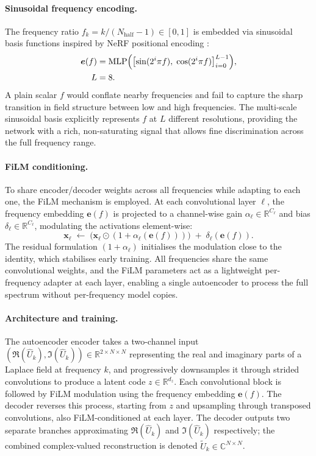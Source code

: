 \documentclass[a4paper, twocolumn]{article}
\newcommand{\R}{\mathbb{R}}
\newcommand{\C}{\mathbb{C}}
\begin{document}
\paragraph{Sinusoidal frequency encoding.}
The frequency ratio $f_k = k/(N_{\mathrm{half}}-1) \in [0,1]$ is embedded via sinusoidal basis functions inspired by NeRF positional encoding \cite{mildenhall2020nerf}:
\begin{equation}
\begin{split}
    \bm{e}(f) &= \mathrm{MLP}\Bigl(\bigl[\sin(2^i\pi f),\; \cos(2^i\pi f)\bigr]_{i=0}^{L-1}\Bigr), \\
    L &= 8.
\end{split}
    \label{eq:posenc}
\end{equation}
A plain scalar $f$ would conflate nearby frequencies and fail to capture the sharp transition in field structure between low and high frequencies. The multi-scale sinusoidal basis explicitly represents $f$ at $L$ different resolutions, providing the network with a rich, non-saturating signal that allows fine discrimination across the full frequency range.

\paragraph{FiLM conditioning.}
To share encoder/decoder weights across all frequencies while adapting to each one, the FiLM mechanism \cite{perez2018film} is employed. At each convolutional layer $\ell$, the frequency embedding $\bm{e}(f)$ is projected to a channel-wise gain $\alpha_\ell \in \R^{C_\ell}$ and bias $\delta_\ell \in \R^{C_\ell}$, modulating the activations element-wise:
\begin{equation}
    \bm{x}_\ell \;\leftarrow\; \bigl(\bm{x}_\ell \odot (1 + \alpha_\ell(\bm{e}(f)))\bigr) \;+\; \delta_\ell(\bm{e}(f)).
    \label{eq:film}
\end{equation}
The residual formulation $(1 + \alpha_\ell)$ initialises the modulation close to the identity, which stabilises early training. All frequencies share the same convolutional weights, and the FiLM parameters act as a lightweight per-frequency adapter at each layer, enabling a single autoencoder to process the full spectrum without per-frequency model copies.

\paragraph{Architecture and training.}
The autoencoder encoder takes a two-channel input $(\Re(\hat{U}_k), \Im(\hat{U}_k)) \in \R^{2 \times N \times N}$ representing the real and imaginary parts of a Laplace field at frequency $k$, and progressively downsamples it through strided convolutions to produce a latent code $z \in \R^{d_z}$. Each convolutional block is followed by FiLM modulation using the frequency embedding $\bm{e}(f)$. The decoder reverses this process, starting from $z$ and upsampling through transposed convolutions, also FiLM-conditioned at each layer. The decoder outputs two separate branches approximating $\Re(\hat{U}_k)$ and $\Im(\hat{U}_k)$ respectively; the combined complex-valued reconstruction is denoted $\tilde{U}_k \in \C^{N \times N}$.
\end{document}
